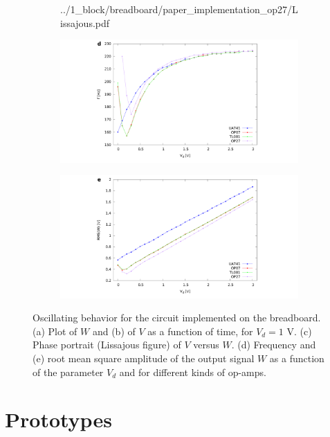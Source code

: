 \begin{figure}[H]
\begin{subfigure}{.39\textwidth}
        {../1_block/breadboard/paper_implementation_op27/Lissajous.pdf}
    \end{subfigure}
    \begin{subfigure}{.49\textwidth}
        \includegraphics[width=\linewidth,trim={10cm 0 9cm 0},clip,left]
        {../1_block/breadboard/freq_bread.pdf}
    \end{subfigure}
    \begin{subfigure}{.49\textwidth}
        \centering
        \includegraphics[width=\linewidth,trim={9cm 0 10cm 0},clip,right]
        {../1_block/breadboard/rms_bread.pdf}
    \end{subfigure}
    \caption{Oscillating behavior for the circuit implemented on
    the breadboard. (a) Plot of $W$ and (b) of $V$ as a function of time,
    for $V_d=1$ V.
    (c) Phase portrait (Lissajous figure) of $V$ versus $W$. (d)
    Frequency and (e) root mean square amplitude of the
    output signal $W$ as a function of the parameter $V_d$ and for
    different kinds of op-amps.}\label{fig:oscillation breadboard}
\end{figure}


\section{Prototypes}\label{sec:prototypes}

